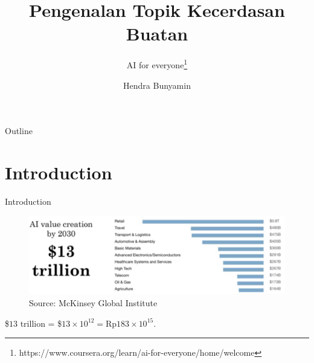 \documentclass[pdf]{beamer}
\title[AI untuk Semua] %
{\textbf{Pengenalan Topik Kecerdasan Buatan}}
\subtitle
{AI for everyone\footnote{https://www.coursera.org/learn/ai-for-everyone/home/welcome}}
\author[Hendra Bunyamin] %
{Hendra Bunyamin}
\institute[ ] %
{
  Jurusan Teknik Informatika\\
  Fakultas Teknologi Informasi\\
  Universitas Kristen Maranatha
}
\theoremstyle{mystyle}
\begin{document}
\begin{frame}
  \titlepage
\end{frame}

\begin{frame}{Outline}
  \tableofcontents
\end{frame}






\section{Introduction}
\begin{frame}{Introduction}
	\begin{figure}[!ht]
		\centering
		\includegraphics[scale=.225]{AI-value-creation}
		\caption{Source: McKinsey Global Institute~\citep{ng2019AIForEveryone}}
		\label{fig:ai-value-creation}
	\end{figure}
	\$$13$ trillion = \$$13 \times 10^{12} = \text{Rp}183 \times 10^{15}$. 
\end{frame}
\end{document}
